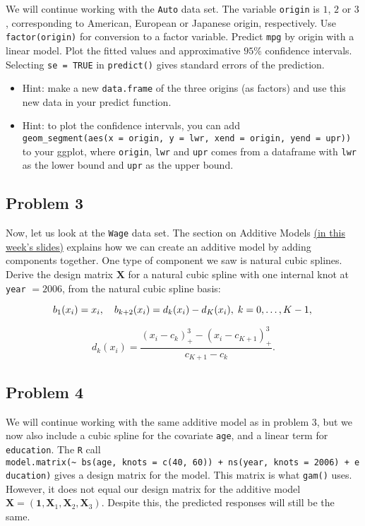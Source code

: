 \documentclass[
]{article}
\begin{document}
We will continue working with the \texttt{Auto} data set. The variable
\texttt{origin} is \(1\), \(2\) or \(3\), corresponding to American,
European or Japanese origin, respectively. Use \texttt{factor(origin)}
for conversion to a factor variable. Predict \texttt{mpg} by origin with
a linear model. Plot the fitted values and approximative \(95\%\)
confidence intervals. Selecting \texttt{se\ =\ TRUE} in
\texttt{predict()} gives standard errors of the prediction.

\begin{itemize}
\item
  Hint: make a new \texttt{data.frame} of the three origins (as factors)
  and use this new data in your predict function.
\item
  Hint: to plot the confidence intervals, you can add
  \texttt{geom\_segment(aes(x\ =\ origin,\ y\ =\ lwr,\ xend\ =\ origin,\ yend\ =\ upr))}
  to your ggplot, where \texttt{origin}, \texttt{lwr} and \texttt{upr}
  comes from a dataframe with \texttt{lwr} as the lower bound and
  \texttt{upr} as the upper bound.
\end{itemize}

\hypertarget{problem-3}{%
\subsection{Problem 3}\label{problem-3}}

Now, let us look at the \texttt{Wage} data set. The section on Additive
Models
\href{https://github.com/stefaniemuff/statlearning2/blob/master/7BeyondLinear/7BeyondLinear_2024.pdf}{(in
this week's slides)} explains how we can create an additive model by
adding components together. One type of component we saw is natural
cubic splines. Derive the design matrix \(\mathbf{X}\) for a natural
cubic spline with one internal knot at \texttt{year} \(= 2006\), from
the natural cubic spline basis:

\[
b_1(x_i) = x_i, \quad b_{k+2}(x_i) = d_k(x_i)-d_K(x_i),\; k = 0, \ldots, K - 1,\\
\]

\[
d_k(x_i) = \frac{(x_i-c_k)^3_+-(x_i-c_{K+1})^3_+}{c_{K+1}-c_k}.
\]

\hypertarget{problem-4}{%
\subsection{Problem 4}\label{problem-4}}

We will continue working with the same additive model as in problem 3,
but we now also include a cubic spline for the covariate \texttt{age},
and a linear term for \texttt{education}. The \texttt{R} call
\texttt{model.matrix(\textasciitilde{}\ bs(age,\ knots\ =\ c(40,\ 60))\ +\ ns(year,\ knots\ =\ 2006)\ +\ education)}
gives a design matrix for the model. This matrix is what \texttt{gam()}
uses. However, it does not equal our design matrix for the additive
model
\(\mathbf X = (\mathbf{1}, \mathbf{X}_1, \mathbf{X}_2, \mathbf{X}_3)\).
Despite this, the predicted responses will still be the same.
\end{document}
